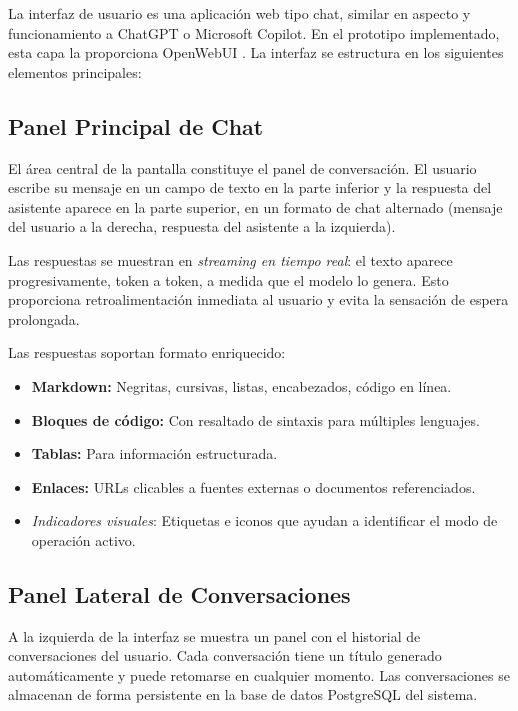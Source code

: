 La interfaz de usuario es una aplicación web tipo chat, similar en aspecto y funcionamiento a ChatGPT o Microsoft Copilot. En el prototipo implementado, esta capa la proporciona OpenWebUI \cite{openwebui2024docs}. La interfaz se estructura en los siguientes elementos principales:

\subsection{Panel Principal de Chat}

El área central de la pantalla constituye el panel de conversación. El usuario escribe su mensaje en un campo de texto en la parte inferior y la respuesta del asistente aparece en la parte superior, en un formato de chat alternado (mensaje del usuario a la derecha, respuesta del asistente a la izquierda).

Las respuestas se muestran en \textit{streaming en tiempo real}: el texto aparece progresivamente, token a token, a medida que el modelo lo genera. Esto proporciona retroalimentación inmediata al usuario y evita la sensación de espera prolongada.

Las respuestas soportan formato enriquecido:
\begin{itemize}
    \item \textbf{Markdown:} Negritas, cursivas, listas, encabezados, código en línea.
    \item \textbf{Bloques de código:} Con resaltado de sintaxis para múltiples lenguajes.
    \item \textbf{Tablas:} Para información estructurada.
    \item \textbf{Enlaces:} URLs clicables a fuentes externas o documentos referenciados.
    \item \textit{Indicadores visuales}: Etiquetas e iconos que ayudan a identificar el modo de operación activo.
\end{itemize}

\subsection{Panel Lateral de Conversaciones}

A la izquierda de la interfaz se muestra un panel con el historial de conversaciones del usuario. Cada conversación tiene un título generado automáticamente y puede retomarse en cualquier momento. Las conversaciones se almacenan de forma persistente en la base de datos PostgreSQL del sistema.

